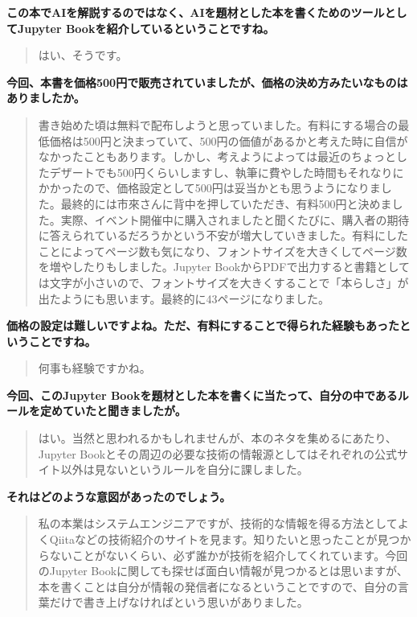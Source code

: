 \documentclass[dvipdfmx,autodetect-engine,10pt,b5paper,papersize,openany,dvipsnames]{jsbook}
\begin{document}
\begin{multicols}{2}
\noindent
\textbf{この本でAIを解説するのではなく、AIを題材とした本を書くためのツールとしてJupyter Bookを紹介しているということですね。}


\begin{quotation}
  \noindent
はい、そうです。
\end{quotation}


\noindent
\textbf{今回、本書を価格500円で販売されていましたが、価格の決め方みたいなものはありましたか。}


\begin{quotation}
  \noindent
書き始めた頃は無料で配布しようと思っていました。有料にする場合の最低価格は500円と決まっていて、500円の価値があるかと考えた時に自信がなかったこともあります。しかし、考えようによっては最近のちょっとしたデザートでも500円くらいしますし、執筆に費やした時間もそれなりにかかったので、価格設定として500円は妥当かとも思うようになりました。最終的には市來さんに背中を押していただき、有料500円と決めました。実際、イベント開催中に購入されましたと聞くたびに、購入者の期待に答えられているだろうかという不安が増大していきました。有料にしたことによってページ数も気になり、フォントサイズを大きくしてページ数を増やしたりもしました。Jupyter BookからPDFで出力すると書籍としては文字が小さいので、フォントサイズを大きくすることで「本らしさ」が出たようにも思います。最終的に43ページになりました。
\end{quotation}


\noindent
\textbf{価格の設定は難しいですよね。ただ、有料にすることで得られた経験もあったということですね。}


\begin{quotation}
  \noindent
何事も経験ですかね。
\end{quotation}


\noindent
\textbf{今回、このJupyter Bookを題材とした本を書くに当たって、自分の中であるルールを定めていたと聞きましたが。}


\begin{quotation}
  \noindent
はい。当然と思われるかもしれませんが、本のネタを集めるにあたり、Jupyter Bookとその周辺の必要な技術の情報源としてはそれぞれの公式サイト以外は見ないというルールを自分に課しました。
\end{quotation}


\noindent
\textbf{それはどのような意図があったのでしょう。}


\begin{quotation}
  \noindent
私の本業はシステムエンジニアですが、技術的な情報を得る方法としてよくQiitaなどの技術紹介のサイトを見ます。知りたいと思ったことが見つからないことがないくらい、必ず誰かが技術を紹介してくれています。今回のJupyter Bookに関しても探せば面白い情報が見つかるとは思いますが、本を書くことは自分が情報の発信者になるということですので、自分の言葉だけで書き上げなければという思いがありました。
\end{quotation}



\end{multicols}
\end{document}
